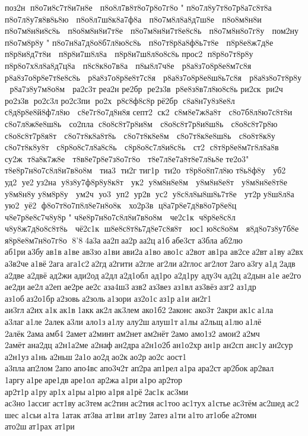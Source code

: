  поз2н  п8о7и8с7т8и7н8е   п8о8л7в8т8о7р8о7г8о  " п8о7л8у7т8о7р8а7с8т8а   п8о7л8у7я8в8ь8ю   п8о8л7ш8к8а7ф8а   п8о7м8л8а8д7ш8е   п8о8м8н8и   п8о7м8н8и8с8ь   п8о8м8н8и7т8е   п8о7м8н8и7т8е8с8ь   п8о7м8н8о7г8у   пом2ну  п8о7м8р8у  " п8о7н8а7д8о8б7л8ю8с8ь   п8о7т8р8а8ф8ь7т8е   п8р8е8ж7д8е   п8р8и8д7т8и   п8р8и7ш8л8а   п8р8и7ш8л8о8с8ь  
 прос2  п8р8о7т8р8у   п8р8о7х8л8а8д7ц8а   п8с8к8о7в8а   п8ы8л7ч8е   р8а8з7о8р8е8м7с8я   р8а8з7о8р8е7т8е8с8ь   р8а8з7о8р8е8т7с8я   р8а8з7о8р8е8ш8ь7с8я   р8а8з8о7т8р8у   р8а7з8у7м8о8м   ра2с3т 
 реа2н 
 ре2бр  ре2з3в  р8е8з8в7л8ю8с8ь  
 ри2ск  ри2ч  ро2з3в  ро2с3л 
 ро2с3пи  ро2х  р8с8ф8с8р  
 рё2бр  с8а8н7у8з8е8л   с8д8р8е8й8ф7л8ю   с8е7г8о7д8н8я  
 септ2  ск2  с8м8е7ж8а8т   с8о7б8л8ю7с8т8и   с8о7л8ж8е8ш8ь   со2пла  с8о8с8т7р8и8м   с8о8с8т7р8и8ш8ь   с8о8с8т7р8ю   с8о8с8т7р8я8т   с8о7т8к8а8т8ь   с8о7т8к8е8м   с8о7т8к8е8ш8ь   с8о8т8к8у   с8о7т8к8у8т   с8р8о8с7л8а8с8ь   с8р8о8с7л8и8с8ь   ст2  с8т8р8е8м7г8л8а8в   су2ж  т8а8к7ж8е   т8в8е7р8е7з8о7г8о   т8е7л8е7а8т8е7л8ь8е  	 те2о3 " т8е8р7н8о7с8л8и7в8о8м   тиа3  ти2г 
 тиг1р  ти2о  т8р8о8п7л8ю  
 т8ь8ф8у   уб2  уд2  уе2 
 уз2на  у8з8у7ф8р8у8к8т   ук2  у8м8н8е8м   у8м8н8е8т   у8м8н8е8т8е  
 у8м8н8у  
 у8м8р8у   ум2ч  уо3  уп2  ур2в  ус2  у8с8л8ы8ш8ь7т8е   ут2р 
 у8ш8л8а   ую2  уё2  ф8о7т8о7п8л8е7н8о8к   хо2р3в  ц8а7р8е7д8в8о7р8е8ц   ч8е7р8е8с7ч8у8р  " ч8е8р7н8о7с8л8и7в8о8м   че2с1к  ч8р8е8с8л   ч8у8ж7д8о8с8т8ь   чё2с1к  ш8е8с8т8ь7д8е7с8я8т   юс1 
 ю8с8о8м   я8д8о7з8у7б8е   я8р8е8м7н8о7г8о  8'8 4а3а аа2п аа2р аа2ц а1б абе3ст 	а3бла 	аб2лю 	аб1ри а3бу ав1в а1ве 	ав3зо а1ви 	ави2а а1во 	аво1с 	а2вот 	ав1ра 	ав2се а2вт а1ву а2вх 
а3в2че а1вё 2ага 
ага1с2 а2гд а2гити 	а2гле 	аг2ли а2глос аг2лот 2аго а3гу а1д 2адв 	а2две 	а2двё 	ад2жи ади2од а2дл а2д1обл 	ад1ро 
а2д1ру 	аду3ч ад2ц 	а2дын а1е 	ае2го 	ае2ди ае2л а2еп 	ае2ре ае2с 
аза4ш3 азв2 аз3вез 	аз1вл аз3вёз азг2 	аз1др 	аз1об аз2о1бр а2зовь а2золь а1зори 
аз2о1с аз1р а1и аи2г1 	аи3гл а2их а1к ак1в 1акк ак2л ак3лем 
ако1б2 2аконс 	ако3т 	2акри ак1с а1ла 	а3лаг а1ле 	2алек а3ли 	ало1з а1лу 	алу2ш алуш1т а1лы 	а2льщ а1лю а1лё 	2алёк 2ама амб4 	2амет а2минт ам2нет ам2нёт 2амо 
амо1з2 	амои2 а2мч 	2амёт ана2дц 
а2н1а2ме 	а2наф ан2дра а2н1о2б ан1о2хр ан1р 	ан2сп 	анс1у ан2сур 
а2н1уз а1нь 	а2ньш 2а1о ао2д ао2к ао2р ао2с 	аост1 	а3пла ап2лом 2апо апо4вс апо3ч2т 	ап2ра ап1рел а1ра ара2ст ар2бок ар2вал 	1аргу а1ре аре1дв аре1ол 	ар2жа а1ри а1ро ар2тор 
ар2т1р а1ру ар1х а1ры а1рю а1ря а1рё 2ас1к 	ас3ми 	ас3но 1ассиг аст1ву ас3тем ас2тин ас2тия ас1тоо ас1тух а1стье ас3тём ас2шед ас2шес 	а1сьи а1та 	1атак 	ат3ва 	ат1ви 	ат1ву 	2атез а1ти а1то ат1обе а2томн 	ато2ш ат1рах 	ат1ри 
